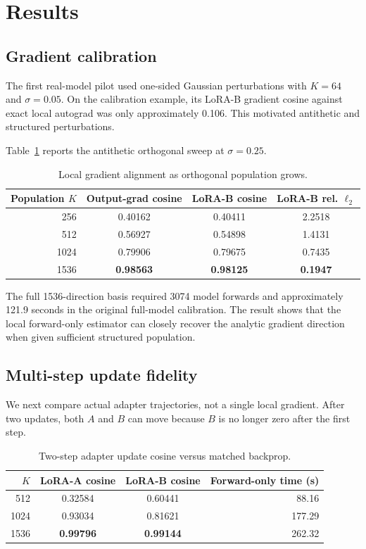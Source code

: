 \documentclass[11pt]{article}
\begin{document}
\section{Results}

\subsection{Gradient calibration}

The first real-model pilot used one-sided Gaussian perturbations with
$K=64$ and $\sigma=0.05$. On the calibration example, its LoRA-B gradient
cosine against exact local autograd was only approximately 0.106. This
motivated antithetic and structured perturbations.

Table~\ref{tab:gradient} reports the antithetic orthogonal sweep at
$\sigma=0.25$.

\begin{table}[t]
\centering
\caption{Local gradient alignment as orthogonal population grows.}
\label{tab:gradient}
\begin{tabular}{rccc}
\toprule
Population $K$ & Output-grad cosine & LoRA-B cosine & LoRA-B rel. $\ell_2$ \\
\midrule
256  & 0.40162 & 0.40411 & 2.2518 \\
512  & 0.56927 & 0.54898 & 1.4131 \\
1024 & 0.79906 & 0.79675 & 0.7435 \\
1536 & \textbf{0.98563} & \textbf{0.98125} & \textbf{0.1947} \\
\bottomrule
\end{tabular}
\end{table}

The full 1536-direction basis required 3074 model forwards and approximately
121.9 seconds in the original full-model calibration. The result shows that
the local forward-only estimator can closely recover the analytic gradient
direction when given sufficient structured population.

\subsection{Multi-step update fidelity}

We next compare actual adapter trajectories, not a single local gradient.
After two updates, both $A$ and $B$ can move because $B$ is no longer zero
after the first step.

\begin{table}[t]
\centering
\caption{Two-step adapter update cosine versus matched backprop.}
\label{tab:updates}
\begin{tabular}{rccr}
\toprule
$K$ & LoRA-A cosine & LoRA-B cosine & Forward-only time (s) \\
\midrule
512  & 0.32584 & 0.60441 & 88.16 \\
1024 & 0.93034 & 0.81621 & 177.29 \\
1536 & \textbf{0.99796} & \textbf{0.99144} & 262.32 \\
\bottomrule
\end{tabular}
\end{table}
\end{document}
